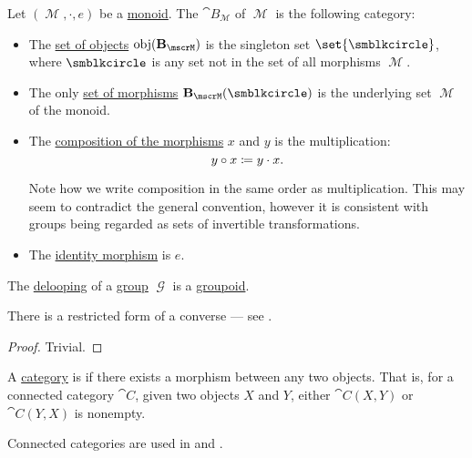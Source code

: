 \begin{definition}\label{def:monoid_delooping}
  Let \( (\mscrM, \cdot, e) \) be a \hyperref[def:monoid]{monoid}. The  \( \cat{B}_\mscrM \) of \( \mscrM \) is the following category:
  \begin{itemize}
    \item The \hyperref[def:category/objects]{set of objects} \( \obj(\cat{B}_\mscrM) \) is the singleton set \( \set{ \anon } \), where \( \anon \) is any set not in the set of all morphisms \( \mscrM \).

    \item The only \hyperref[def:category/morphisms]{set of morphisms} \( \cat{B}_\mscrM(\anon) \) is the underlying set \( \mscrM \) of the monoid.

    \item The \hyperref[def:category/composition]{composition of the morphisms} \( x \) and \( y \) is the multiplication:
    \begin{equation*}
      y \bincirc x \coloneqq y \cdot x.
    \end{equation*}

    Note how we write composition in the same order as multiplication. This may seem to contradict the general convention, however it is consistent with groups being regarded as sets of invertible transformations.

    \item The \hyperref[def:category/identity]{identity morphism} is \( e \).
  \end{itemize}
\end{definition}

\begin{proposition}\label{thm:delooping_of_group}
  The \hyperref[def:delooping]{delooping} of a \hyperref[def:group]{group} \( \mscrG \) is a \hyperref[def:groupoid]{groupoid}.

  There is a restricted form of a converse --- see .
\end{proposition}
\begin{proof}
  Trivial.
\end{proof}

\begin{definition}\label{def:connected_category}
  A \hyperref[def:category]{category} is  if there exists a morphism between any two objects. That is, for a connected category \( \cat{C} \), given two objects \( X \) and \( Y \), either \( \cat{C}(X, Y) \) or \( \cat{C}(Y, X) \) is nonempty.

  Connected categories are used in  and .
\end{definition}


